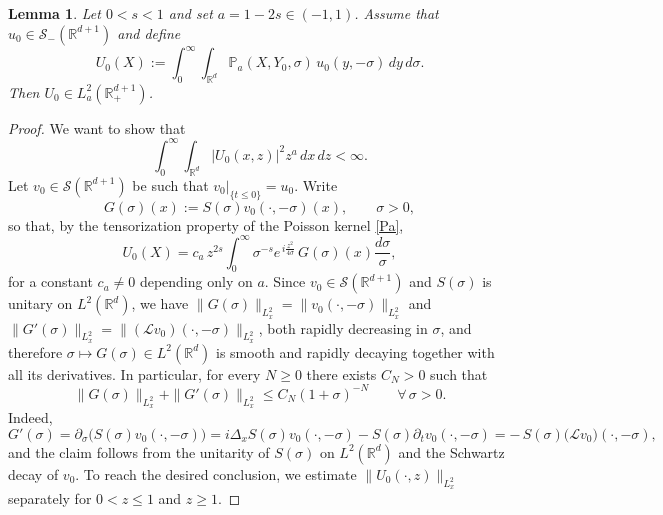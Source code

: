 \documentclass[11pt,letter]{amsart}
\def \RNu {\mathbb{R}^{d+1}}
\def \R {\mathbb{R}}
\newcommand{\Rd}{\mathbb R^d}
\numberwithin{equation}{section}
\newcommand{\Le}{\mathcal L}
\newcommand{\Sm}{\mathscr S_-(\RNu)}
\newtheorem{lemma}[theorem]{Lemma}
\numberwithin{equation}{section}
\begin{document}
\begin{lemma}\label{L:U0L2}
Let $0<s<1$ and set $a=1-2s\in(-1,1)$. Assume that
$u_0\in \Sm$ and define
\begin{equation}\label{lift2}
U_0(X) := \int_0^\infty\int_{\R^d}
\mathbb P_a(X,Y_0,\sigma)\,u_0(y,-\sigma)\,dy\,d\sigma.
\end{equation}
Then $U_0\in L_a^2(\R^{d+1}_+)$.
\end{lemma}

\begin{proof}
We want to show that
\begin{equation}\label{goal}
\int_0^\infty\int_{\Rd}|U_0(x,z)|^2 z^a\,dx\,dz<\infty.
\end{equation}
 Let $v_0\in \mathscr S(\RNu)$ be such that $v_0|_{\{t\le 0\}} = u_0$. Write
\[
G(\sigma)(x):=S(\sigma)v_0(\cdot,-\sigma)(x),
\qquad \sigma>0,
\]
so that, by the tensorization property of the Poisson kernel \eqref{Pa},
\[
U_0(X)
=
c_a\,z^{2s}\int_0^\infty \sigma^{-s}
e^{\,i\frac{z^2}{4\sigma}}\,G(\sigma)(x)\frac{d\sigma}{\sigma},
\]
for a constant $c_a\neq 0$ depending only on $a$.
Since $v_0\in\mathscr S(\RNu)$ and $S(\sigma)$ is unitary on $L^2(\Rd)$, we have $\|G(\sigma)\|_{L^2_x}=\|v_0(\cdot,-\sigma)\|_{L^2_x}$ and $\|G'(\sigma)\|_{L^2_x}=\|(\Le v_0)(\cdot,-\sigma)\|_{L^2_x}$, both rapidly decreasing in $\sigma$, and therefore
$\sigma\mapsto G(\sigma)\in L^2(\Rd)$ is smooth and rapidly decaying together
with all its derivatives. In particular, for every $N\ge 0$ there exists
$C_N>0$ such that
\[
\|G(\sigma)\|_{L^2_x}+\|G'(\sigma)\|_{L^2_x}
\le C_N(1+\sigma)^{-N}
\qquad\forall\,\sigma>0.
\]
Indeed,
\begin{equation}\label{Gprime}
G'(\sigma)
=
\partial_\sigma\bigl(S(\sigma)v_0(\cdot,-\sigma)\bigr)
=
i\Delta_xS(\sigma)v_0(\cdot,-\sigma)
-
S(\sigma)\partial_t v_0(\cdot,-\sigma)
=
-\,S(\sigma)\bigl(\Le v_0\bigr)(\cdot,-\sigma),
\end{equation}
and the claim follows from the unitarity of
$S(\sigma)$ on $L^2(\R^d)$ and the Schwartz decay of $v_0$.
To reach the desired conclusion, we estimate $\|U_0(\cdot,z)\|_{L^2_x}$ separately for $0<z\le 1$ and $z\ge 1$.


\end{proof}
\end{document}
